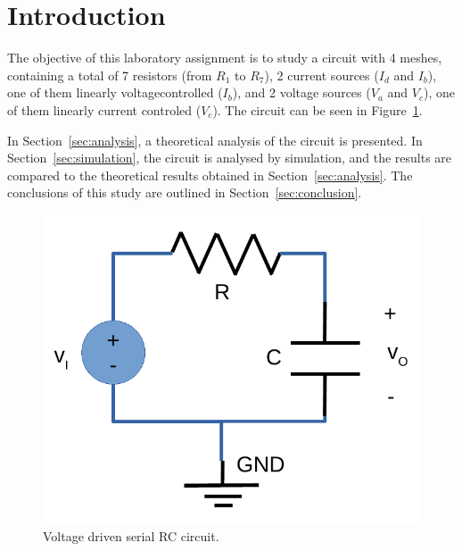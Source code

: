\section{Introduction}
\label{sec:introduction}

The objective of this laboratory assignment is to study a circuit with 4 meshes, containing a total of 7 resistors (from $R_1$ to $R_7$), 2 current sources ($I_d$ and $I_b$), one of them linearly voltagecontrolled ($I_b$), and 2 voltage sources ($V_a$ and $V_c$), one of them linearly current controled ($V_c$). The circuit can be seen in Figure~\ref{fig:rc}.

In Section~\ref{sec:analysis}, a theoretical analysis of the circuit is
presented. In Section~\ref{sec:simulation}, the circuit is analysed by
simulation, and the results are compared to the theoretical results obtained in
Section~\ref{sec:analysis}. The conclusions of this study are outlined in
Section~\ref{sec:conclusion}.

\begin{figure}[h] \centering
\includegraphics[width=0.4\linewidth]{rc.pdf}
\caption{Voltage driven serial RC circuit.}
\label{fig:rc}
\end{figure}

